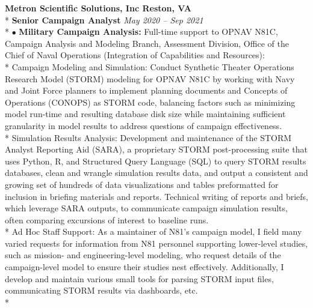 \documentclass{article}
\begin{document}
\noindent \textbf{Metron Scientific Solutions, Inc \hfill Reston, VA} \\*
\textbf{Senior Campaign Analyst} \hfill \textit{May 2020 -- Sep 2021} \\*
$\bullet$ \textbf{Military Campaign Analysis:} Full-time support to OPNAV N81C, Campaign Analysis and Modeling Branch, Assessment Division, Office of the Chief of Naval Operations (Integration of Capabilities and Resources):\\*
\indent \textendash Campaign Modeling and Simulation: Conduct Synthetic Theater Operations Research Model (STORM) modeling for OPNAV N81C by working with Navy and Joint Force planners to implement planning documents and Concepts of Operations (CONOPS) as STORM code, balancing factors such as minimizing model run-time and resulting database disk size while maintaining sufficient granularity in model results to address questions of campaign effectiveness.\\*
\indent \textendash Simulation Results Analysis: Development and maintenance of the STORM Analyst Reporting Aid (SARA), a proprietary STORM post-processing suite that uses Python, R, and Structured Query Language (SQL) to query STORM results databases, clean and wrangle simulation results data, and output a consistent and growing set of hundreds of data visualizations and tables preformatted for inclusion in briefing materials and reports. Technical writing of reports and briefs, which leverage SARA outputs, to communicate campaign simulation results, often comparing excursions of interest to baseline runs. \\*
\indent \textendash Ad Hoc Staff Support: As a maintainer of N81's campaign model, I field many varied requests for information from N81 personnel supporting lower-level studies, such as mission- and engineering-level modeling, who request details of the campaign-level model to ensure their studies nest effectively. Additionally, I develop and maintain various small tools for parsing STORM input files, communicating STORM results via dashboards, etc. \\*
\end{document}
